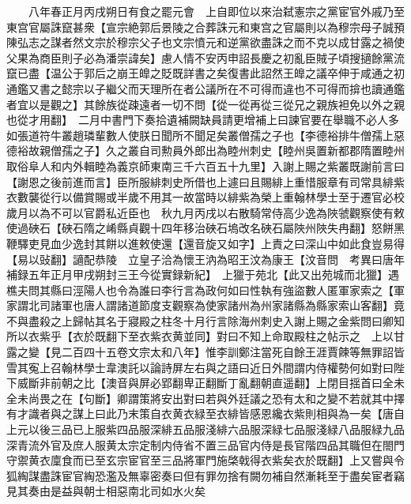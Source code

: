 　　八年春正月丙戌朔日有食之罷元會　上自即位以來治弑憲宗之黨宦官外戚乃至東宫官屬誅竄甚衆【宣宗絶郭后景陵之合葬誅元和東宫之官屬則以為穆宗母子誠預陳弘志之謀者然文宗於穆宗父子也文宗憤元和逆黨欲盡誅之而不克以成甘露之禍使父果為商臣則子必為潘崇諱矣】慮人情不安丙申詔長慶之初亂臣賊子頃搜擿餘黨流竄已盡【温公于郭后之崩王皥之貶既詳書之矣復書此詔然王皥之議卒伸于咸通之初通鑑又書之懿宗以子繼父而天理所在者公議所在不可得而違也不可得而揜也讀通鑑者宜以是觀之】其餘族從疎遠者一切不問【從一從再從三從兄之親族袒免以外之親也從才用翻】　二月中書門下奏拾遺補闕缺員請更增補上曰諫官要在舉職不必人多如張道符牛叢趙璘輩數人使朕日聞所不聞足矣叢僧孺之子也【李德裕排牛僧孺上惡德裕故親僧孺之子】久之叢自司勲員外郎出為睦州刺史【睦州吳置新都郡隋置睦州取俗阜人和内外輯睦為義京師東南三千六百五十九里】入謝上賜之紫叢既謝前言曰【謝恩之後前進而言】臣所服緋刺史所借也上遽曰且賜緋上重惜服章有司常具緋紫衣數襲從行以備賞賜或半歲不用其一故當時以緋紫為榮上重翰林學士至于遷官必校歲月以為不可以官爵私近臣也　秋九月丙戌以右散騎常侍高少逸為陜虢觀察使有敕使過硤石【硤石隋之崤縣貞觀十四年移治硤石塢改名硤石屬陜州陜失冉翻】怒餅黑鞭驛吏見血少逸封其餅以進敕使還【還音旋又如字】上責之曰深山中如此食豈易得【易以䜴翻】讁配恭陵　立皇子洽為懷王汭為昭王汶為康王【汶音問　考異曰唐年補録五年正月甲戌朔封三王今從實録新紀】　上獵于苑北【此又出苑城而北獵】遇樵夫問其縣曰涇陽人也令為誰曰李行言為政何如曰性執有強盜數人匿軍家索之【軍家謂北司諸軍也唐人謂諸道節度支觀察為使家諸州為州家諸縣為縣家索山客翻】竟不與盡殺之上歸帖其名于寢殿之柱冬十月行言除海州刺史入謝上賜之金紫問曰卿知所以衣紫乎【衣於既翻下至衣紫衣黄並同】對曰不知上命取殿柱之帖示之　上以甘露之變【見二百四十五卷文宗太和八年】惟李訓鄭注當死自餘王涯賈餗等無罪詔皆雪其寃上召翰林學士韋澳託以論詩屏左右與之語曰近日外間謂内侍權勢何如對曰陛下威斷非前朝之比【澳音與屏必郢翻卑正翻斷丁亂翻朝直遥翻】上閉目揺首曰全未全未尚畏之在【句斷】卿謂策將安出對曰若與外廷議之恐有太和之變不若就其中擇有才識者與之謀上曰此乃末策自衣黄衣緑至衣緋皆感恩纔衣紫則相與為一矣【唐自上元以後三品已上服紫四品服深緋五品服淺緋六品服深緑七品服淺緑八品服緑九品深青流外官及庶人服黄太宗定制内侍省不置三品官内侍是長官階四品其職但在閤門守禦黄衣廩食而已至玄宗宦官至三品將軍門施棨戟得衣紫矣衣於既翻】上又嘗與令狐綯謀盡誅宦官綯恐濫及無辜密奏曰但有罪勿捨有闕勿補自然漸耗至于盡矣宦者竊見其奏由是益與朝士相惡南北司如水火矣

